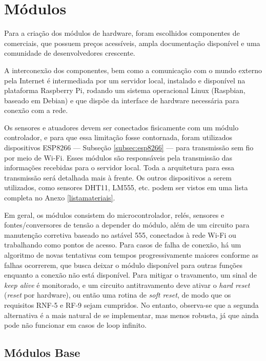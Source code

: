 \section{Módulos}
Para a criação dos módulos de hardware, foram escolhidos componentes de \wiot{} comerciais, que possuem preços acessíveis, ampla documentação disponível e uma comunidade de desenvolvedores crescente.

A interconexão dos componentes, bem como a comunicação com o mundo externo pela Internet é intermediada por um servidor local, instalado e disponível na plataforma Raspberry Pi, rodando um sistema operacional Linux (Raspbian, baseado em Debian) e que dispõe da interface de hardware necessária para conexão com a rede.

Os sensores e atuadores devem ser conectados fisicamente com um módulo controlador, e para que essa limitação fosse contornada, foram utilizados dispositivos ESP8266 --- Subseção \ref{subsec:esp8266} --- para transmissão sem fio por meio de Wi-Fi. Esses módulos são responsáveis pela transmissão das informações recebidas para o servidor local. Toda a arquitetura para essa transmissão será detalhada mais à frente. Os outros dispositivos a serem utilizados, como sensores DHT11, LM555, etc. podem ser vistos em uma lista completa no Anexo \ref{listamateriais}.

Em geral, os módulos consistem do microcontrolador, relés, sensores e fontes\slash{}conversores de tensão a depender do módulo, além de um circuito para manutenção corretiva baseado no astável 555, conectados à rede Wi-Fi ou trabalhando como pontos de acesso. Para casos de falha de conexão, há um algoritmo de novas tentativas com tempos progressivamente maiores conforme as falhas ocorrerem, que busca deixar o módulo disponível para outras funções enquanto a conexão não está disponível. Para mitigar o travamento, um sinal de \textit{keep alive} é monitorado, e um circuito antitravamento deve ativar o \textit{hard reset} (\emph{reset} por hardware), ou então uma rotina de \textit{soft reset}, de modo que os requisitos RNF-5 e RF-9 sejam cumpridos. No entanto, observa-se que a segunda alternativa é a mais natural de se implementar, mas menos robusta, já que ainda pode não funcionar em casos de loop infinito.

\subsection{Módulos Base}
